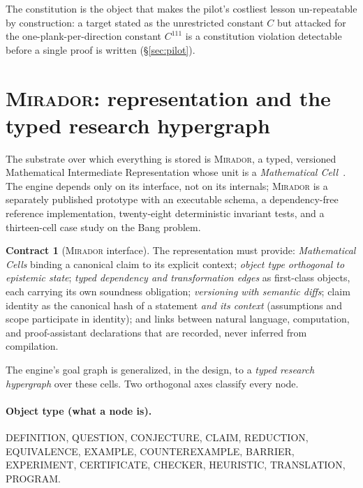 \documentclass[11pt]{amsart}
\theoremstyle{definition}
\newtheorem{contract}{Contract}[section]
\theoremstyle{remark}
\newcommand{\mirador}{\textsc{Mirador}}
\newcommand{\otype}[1]{\textsc{#1}}
\begin{document}
The constitution is the object that makes the pilot's costliest lesson
un-repeatable by construction: a target stated as the unrestricted constant $C$
but attacked for the one-plank-per-direction constant $C^{111}$ is a
constitution violation detectable before a single proof is written
(\S\ref{sec:pilot}).

\section{\mirador{}: representation and the typed research hypergraph}\label{sec:mirador}

The substrate over which everything is stored is \mirador{}, a typed, versioned
Mathematical Intermediate Representation whose unit is a \emph{Mathematical
Cell}~\cite{lucius2026mirador}. The engine depends only on its interface, not on
its internals; \mirador{} is a separately published prototype with an executable
schema, a dependency-free reference implementation, twenty-eight deterministic
invariant tests, and a thirteen-cell case study on the Bang problem.

\begin{contract}[\mirador{} interface]\label{con:mirador}
The representation must provide: \emph{Mathematical Cells} binding a canonical
claim to its explicit context; \emph{object type orthogonal to epistemic state};
\emph{typed dependency and transformation edges} as first-class objects, each
carrying its own soundness obligation; \emph{versioning with semantic diffs};
claim identity as the canonical hash of a statement \emph{and its context}
(assumptions and scope participate in identity); and links between natural
language, computation, and proof-assistant declarations that are recorded, never
inferred from compilation.
\end{contract}

The engine's goal graph is generalized, in the design, to a \emph{typed research
hypergraph} over these cells. Two orthogonal axes classify every node.

\paragraph{Object type (what a node is).}
\otype{DEFINITION}, \otype{QUESTION}, \otype{CONJECTURE}, \otype{CLAIM},
\otype{REDUCTION}, \otype{EQUIVALENCE}, \otype{EXAMPLE}, \otype{COUNTEREXAMPLE},
\otype{BARRIER}, \otype{EXPERIMENT}, \otype{CERTIFICATE}, \otype{CHECKER},
\otype{HEURISTIC}, \otype{TRANSLATION}, \otype{PROGRAM}.
\end{document}
